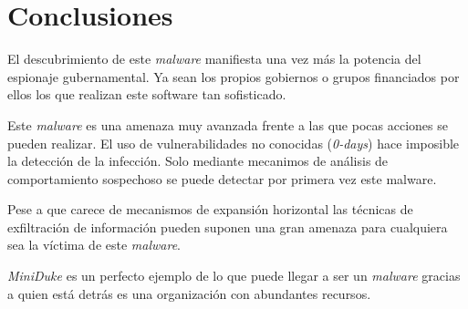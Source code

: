 \documentclass[11pt,a4paper]{article}
\begin{document}
\vspace{-10}
\section{Conclusiones}
\label{sec:conclusiones}
\vspace{-7}
El descubrimiento de este \emph{malware} manifiesta una vez más la
potencia del espionaje gubernamental. Ya sean los propios gobiernos o
grupos financiados por ellos los que realizan este software tan sofisticado.

Este \emph{malware} es una amenaza muy avanzada frente a las que pocas
acciones se pueden realizar. El uso de vulnerabilidades no conocidas
(\emph{0-days}) hace imposible la detección de la infección. Solo
mediante mecanimos de análisis de comportamiento sospechoso se puede
detectar por primera vez este malware.

Pese a que carece de mecanismos de expansión horizontal las técnicas
de exfiltración de información pueden suponen una gran amenaza para
cualquiera sea la víctima de este \emph{malware}.

\emph{MiniDuke} es un perfecto ejemplo de lo que puede llegar a ser un
\emph{malware} gracias a quien está detrás es una organización con
abundantes recursos.

\vspace{-10}


\end{document}
